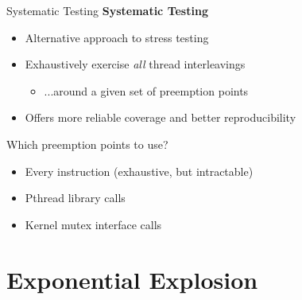 \documentclass[xcolor=dvipsnames]{beamer}
\begin{document}
\begin{frame}{Systematic Testing}
	\textbf{Systematic Testing}
	\begin{itemize}
		\item Alternative approach to stress testing
		\item Exhaustively exercise {\em all} thread interleavings
		\begin{itemize}
			\item ...around a given set of preemption points
		\end{itemize}
		\item Offers more reliable coverage and better reproducibility
	\end{itemize}
	\pause
	\linegap

	Which preemption points to use?
	\begin{itemize}
		\item Every instruction (exhaustive, but intractable)
		\item Pthread library calls
		\item Kernel mutex interface calls
	\end{itemize}

\end{frame}


\section{Exponential Explosion}

\end{document}
